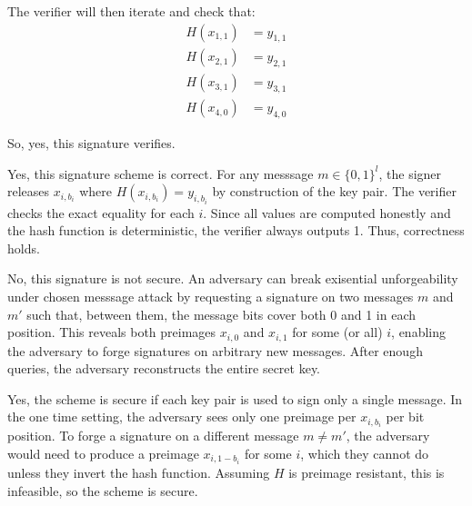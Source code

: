 \documentclass[11pt]{article}
\begin{document}
The verifier will then iterate and check that:
\begin{align*}
    H(x_{1,1}) &= y_{1,1} \\
    H(x_{2,1}) &= y_{2,1} \\
    H(x_{3,1}) &= y_{3,1} \\
    H(x_{4,0}) &= y_{4,0}
\end{align*}

So, yes, this signature verifies.

\begin{p}\end{p}
Yes, this signature scheme is correct. For any messsage $m \in \{0,1\}^{l}$, the signer releases $x_{i,b_i}$ where $H(x_{i,b_i}) = y_{i,b_i}$ by construction of the key pair. The verifier checks the exact equality for each $i$. Since all values are computed honestly and the hash function is deterministic, the verifier always outputs 1. Thus, correctness holds.

\begin{p}\end{p}
No, this signature is not secure. An adversary can break exisential unforgeability under chosen messsage attack by requesting a signature on two messages $m$ and $m'$ such that, between them, the message bits cover both 0 and 1 in each position. This reveals both preimages $x_{i,0}$ and $x_{i,1}$ for some (or all) $i$, enabling the adversary to forge signatures on arbitrary new messages. After enough queries, the adversary reconstructs the entire secret key.

\begin{p}\end{p}
Yes, the scheme is secure if each key pair is used to sign only a single message. In the one time setting, the adversary sees only one preimage per $x_{i,b_i}$ per bit position. To forge a signature on a different message $m \neq m'$, the adversary would need to produce a preimage $x_{i,1-b_i}$ for some $i$, which they cannot do unless they invert the hash function. Assuming $H$ is preimage resistant, this is infeasible, so the scheme is secure.



\end{document}
